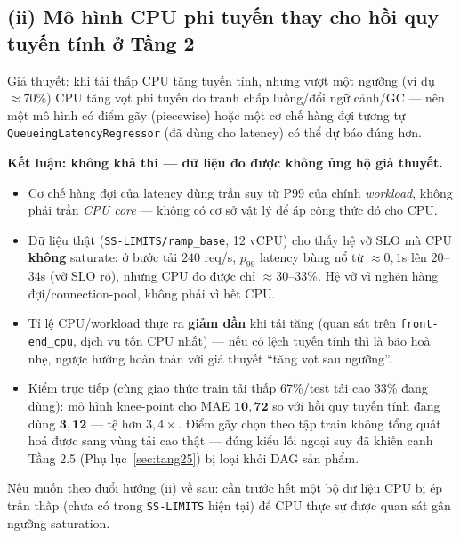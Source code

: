 \documentclass[11pt,a4paper]{article}
\begin{document}
\subsection*{(ii) Mô hình CPU phi tuyến thay cho hồi quy tuyến tính ở Tầng 2}
Giả thuyết: khi tải thấp CPU tăng tuyến tính, nhưng vượt một ngưỡng (ví dụ
$\approx 70\%$) CPU tăng vọt phi tuyến do tranh chấp luồng/đổi ngữ cảnh/GC ---
nên một mô hình có điểm gãy (piecewise) hoặc một cơ chế hàng đợi tương tự
\texttt{QueueingLatencyRegressor} (đã dùng cho latency) có thể dự báo đúng hơn.

\textbf{Kết luận: không khả thi --- dữ liệu đo được không ủng hộ giả thuyết.}
\begin{itemize}[leftmargin=*,itemsep=2pt]
  \item Cơ chế hàng đợi của latency dùng trần suy từ P99 của chính
    \emph{workload}, không phải trần \emph{CPU core} --- không có cơ sở vật lý
    để áp công thức đó cho CPU.
  \item Dữ liệu thật (\texttt{SS-LIMITS/ramp\_base}, 12 vCPU) cho thấy hệ vỡ
    SLO mà CPU \textbf{không} saturate: ở bước tải $240$ req/s, $p_{99}$ latency
    bùng nổ từ $\approx 0{,}1$s lên $20$--$34$s (vỡ SLO rõ), nhưng CPU đo được
    chỉ $\approx 30$--$33\%$. Hệ vỡ vì nghẽn hàng đợi/connection-pool, không
    phải vì hết CPU.
  \item Tỉ lệ CPU/workload thực ra \textbf{giảm dần} khi tải tăng (quan sát
    trên \texttt{front-end\_cpu}, dịch vụ tốn CPU nhất) --- nếu có lệch tuyến
    tính thì là bão hoà nhẹ, ngược hướng hoàn toàn với giả thuyết ``tăng vọt
    sau ngưỡng''.
  \item Kiểm trực tiếp (cùng giao thức train tải thấp 67\%/test tải cao 33\%
    đang dùng): mô hình knee-point cho MAE $\mathbf{10{,}72}$ so với hồi quy
    tuyến tính đang dùng $\mathbf{3{,}12}$ --- tệ hơn $3{,}4\times$. Điểm gãy
    chọn theo tập train không tổng quát hoá được sang vùng tải cao thật ---
    đúng kiểu lỗi ngoại suy đã khiến cạnh Tầng 2.5 (Phụ lục~\ref{sec:tang25})
    bị loại khỏi DAG sản phẩm.
\end{itemize}
Nếu muốn theo đuổi hướng (ii) về sau: cần trước hết một bộ dữ liệu CPU bị ép
trần thấp (chưa có trong \texttt{SS-LIMITS} hiện tại) để CPU thực sự được quan
sát gần ngưỡng saturation.
\end{document}
